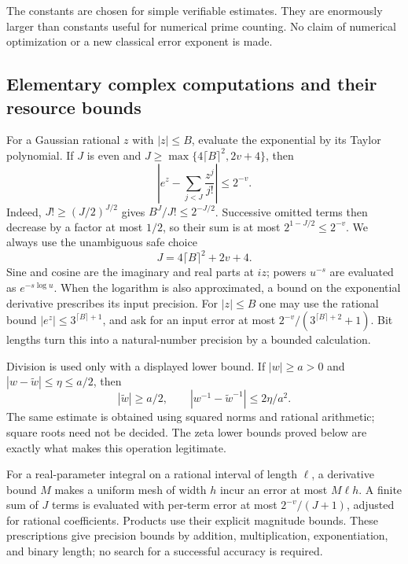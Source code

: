 The constants are chosen for simple verifiable estimates. They are
enormously larger than constants useful for numerical prime counting.
No claim of numerical optimization or a new classical error exponent is made.

\subsection{Elementary complex computations and their resource bounds}

For a Gaussian rational $z$ with $|z|\le B$, evaluate the exponential by
its Taylor polynomial. If $J$ is even and
$J\ge\max\{4\lceil B\rceil^2,2v+4\}$, then
\[
 \left|e^z-\sum_{j<J}\frac{z^j}{j!}\right|\le2^{-v}.
\]
Indeed, $J!\ge(J/2)^{J/2}$ gives $B^J/J!\le2^{-J/2}$.
Successive omitted terms then decrease by a factor at most $1/2$,
so their sum is at most $2^{1-J/2}\le2^{-v}$.
We always use the unambiguous safe choice
\begin{equation}\label{eq:exp-cutoff}
 J=4\lceil B\rceil^2+2v+4.
\end{equation}
Sine and cosine are the imaginary and real parts at $iz$; powers
$u^{-s}$ are evaluated as $e^{-s\log u}$. When the logarithm is also
approximated, a bound on the exponential derivative prescribes its
input precision. For $|z|\le B$ one may use the rational bound
$|e^z|\le3^{\lceil B\rceil+1}$, and ask for an input error at most
$2^{-v}/(3^{\lceil B\rceil+2}+1)$. Bit lengths turn this into a
natural-number precision by a bounded calculation.

Division is used only with a displayed lower bound. If $|w|\ge a>0$
and $|w-\widetilde w|\le\eta\le a/2$, then
\[
 |\widetilde w|\ge a/2,
 \qquad |w^{-1}-\widetilde w^{-1}|\le2\eta/a^2.
\]
The same estimate is obtained using squared norms and rational
arithmetic; square roots need not be decided. The zeta lower bounds
proved below are exactly what makes this operation legitimate.

For a real-parameter integral on a rational interval of length $\ell$,
a derivative bound $M$ makes a uniform mesh of width $h$ incur an error
at most $M\ell h$. A finite sum of $J$ terms is evaluated with
per-term error at most $2^{-v}/(J+1)$, adjusted for rational coefficients.
Products use their explicit magnitude bounds. These prescriptions give
precision bounds by addition, multiplication, exponentiation, and binary
length; no search for a successful accuracy is required.

